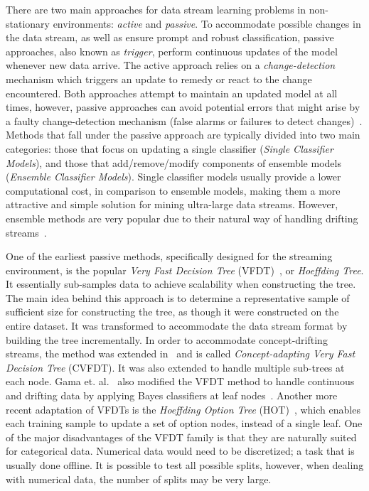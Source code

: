 \documentclass[reqno]{vcuthesis}
\numberwithin{equation}{chapter}
\begin{document}
There are two main approaches for data stream learning problems in non-stationary environments: \textit{active} and \textit{passive}. To accommodate possible changes in the data stream, as well as ensure prompt and robust classification, passive approaches, also known as \textit{trigger}, perform continuous updates of the model whenever new data arrive. The active approach relies on a \textit{change-detection} mechanism which triggers an update to remedy or react to the change encountered. Both approaches attempt to maintain an updated model at all times, however, passive approaches can avoid potential errors that might arise by a faulty change-detection mechanism (false alarms or failures to detect changes)~\cite{ditzler2015learning}. Methods that fall under the passive approach are typically divided into two main categories: those that focus on updating a single classifier (\textit{Single Classifier Models}), and those that add/remove/modify components of ensemble models (\textit{Ensemble Classifier Models}). Single classifier models usually provide a lower computational cost, in comparison to ensemble models, making them a more attractive and simple solution for mining ultra-large data streams. However, ensemble methods are very popular due to their natural way of handling drifting streams~\cite{krawczyk2017ensemble}. 

One of the earliest passive methods, specifically designed for the streaming environment, is the popular \textit{Very Fast Decision Tree} (VFDT)~\cite{domingos2000mining}, or \textit{Hoeffding Tree}. It essentially sub-samples data to achieve scalability when constructing the tree. The main idea behind this approach is to determine a representative sample of sufficient size for constructing the tree, as though it were constructed on the entire dataset. It was transformed to accommodate the data stream format by building the tree incrementally. In order to accommodate concept-drifting streams, the method was extended in~\cite{hulten2001mining} and is called \textit{Concept-adapting Very Fast Decision Tree} (CVFDT). It was also extended to handle multiple sub-trees at each node. Gama et. al.~\cite{gama2006decision} also modified the VFDT method to handle continuous and drifting data by applying Bayes classifiers at leaf nodes~\cite{aggarwal}. Another more recent adaptation of VFDTs is the \textit{Hoeffding Option Tree} (HOT)~\cite{pfahringer2007new}, which enables each training sample to update a set of option nodes, instead of a single leaf. One of the major disadvantages of the VFDT family is that they are naturally suited for categorical data. Numerical data would need to be discretized; a task that is usually done offline. It is possible to test all possible splits, however, when dealing with numerical data, the number of splits may be very large. 
\end{document}
